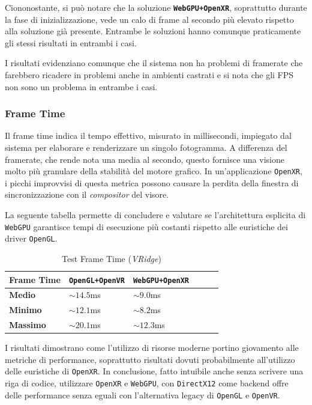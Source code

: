 \documentclass[a4paper, 11pt, twoside]{report}
\begin{document}
Ciononostante, si può notare che la soluzione \textcolor{violet!75}{\textbf{\texttt{WebGPU+OpenXR}}}, soprattutto
durante la fase di inizializzazione, vede un calo di frame al secondo più elevato rispetto alla soluzione già presente.
Entrambe le soluzioni hanno comunque praticamente gli stessi risultati in entrambi i casi.

I risultati evidenziano comunque che il sistema non ha problemi di \gls{framerate} che farebbero ricadere in problemi
anche in ambienti castrati e si nota che gli FPS non sono un problema in entrambe i casi.

\subsubsection{Frame Time}

Il frame time indica il tempo effettivo, misurato in millisecondi, impiegato dal sistema per elaborare e renderizzare
un singolo fotogramma. A differenza del \gls{framerate}, che rende nota una media al secondo, questo fornisce
una visione molto più granulare della stabilità del motore grafico. In un'applicazione \texttt{\gls{OpenXR}}, i picchi
improvvisi di questa metrica possono causare la perdita della finestra di sincronizzazione con il \textit{compositor}
del visore.

La seguente tabella permette di concludere e valutare se l'architettura esplicita di \texttt{WebGPU} garantisce tempi
di esecuzione più costanti rispetto alle euristiche dei driver \texttt{OpenGL}.

\begin{table}[h]
\centering
\caption{Test Frame Time (\textit{VRidge})}
\begin{tabular}{lp{5cm}lp{5cm}lp{5cm}}
\toprule
\textbf{Frame Time} &
\textcolor{blue!40}{\textbf{\texttt{OpenGL+OpenVR}}} &
\textcolor{violet!75}{\textbf{\texttt{WebGPU+OpenXR}}} \\
\midrule
\textbf{Medio}   & $\sim14.5$ms  & $\sim 9.0$ms        \\
\textbf{Minimo}  & $\sim12.1$ms  & $\sim 8.2$ms        \\
\textbf{Massimo} & $\sim20.1$ms  & $\sim12.3$ms        \\
\bottomrule
\end{tabular}
\end{table}

I risultati dimostrano come l'utilizzo di risorse moderne portino giovamento alle metriche di performance, soprattutto
risultati dovuti probabilmente all'utilizzo delle euristiche di \texttt{\gls{OpenXR}}. In conclusione, fatto intuibile
anche senza scrivere una riga di codice, utilizzare \texttt{\gls{OpenXR}} e \texttt{WebGPU}, con \texttt{\gls{DirectX}12}
come backend offre delle performance senza eguali con l'alternativa legacy di \texttt{OpenGL} e \texttt{\gls{OpenVR}}.
\end{document}

